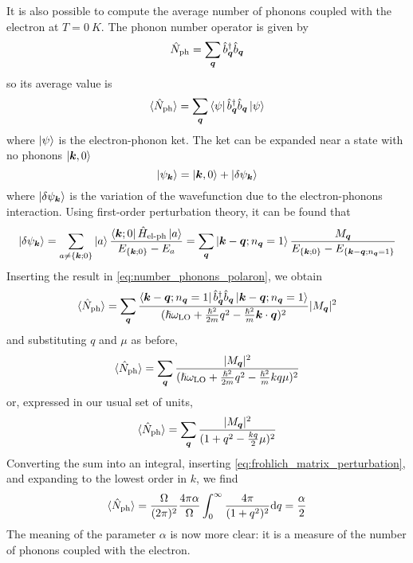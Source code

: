 It is also possible to compute the average number of phonons coupled with the electron at $T = \SI{0}{K}$. The phonon number operator is given by
\begin{equation}
    \hat{N}_\text{ph} = \sum_{\mathbf{\boldsymbol{q}}} \hat{b}^\dagger_{\mathbf{\boldsymbol{q}}} \hat{b}_{\mathbf{\boldsymbol{q}}}
\end{equation}
so its average value is
\begin{equation} \label{eq:number_phonons_polaron}
    \langle \hat{N}_\text{ph} \rangle = \sum_{\mathbf{\boldsymbol{q}}} \bra{\psi} \hat{b}^\dagger_{\mathbf{\boldsymbol{q}}} \hat{b}_{\mathbf{\boldsymbol{q}}} \ket{\psi}
\end{equation}
where $\ket{\psi}$ is the electron-phonon ket. The ket can be expanded near a state with no phonons $\ket{\mathbf{\boldsymbol{k}}, 0}$
\begin{equation}
    \ket{\psi_{\mathbf{\boldsymbol{k}}}} = \ket{\mathbf{\boldsymbol{k}}, 0} + \ket{\delta\psi_{\mathbf{\boldsymbol{k}}}}
\end{equation}
where $\ket{\delta\psi_{\mathbf{\boldsymbol{k}}}}$ is the variation of the wavefunction due to the electron-phonons interaction. Using first-order perturbation theory, it can be found that
\begin{equation} \label{eq:sum_integral}
    \ket{\delta\psi_{\mathbf{\boldsymbol{k}}}} = \sum_{a \neq \{\mathbf{\boldsymbol{k}};0\}} \ket{a} \frac{\bra{\mathbf{\boldsymbol{k}};0} \hat{H}_\text{el-ph} \ket{a}}{E_{\{\mathbf{\boldsymbol{k}};0\}} - E_a}
    = \sum_{\mathbf{\boldsymbol{q}}} \ket{\mathbf{\boldsymbol{k}}-\mathbf{\boldsymbol{q}};n_{\mathbf{\boldsymbol{q}}}=1} \frac{M_{\mathbf{\boldsymbol{q}}}}{E_{\{\mathbf{\boldsymbol{k}};0\}} - E_{\{\mathbf{\boldsymbol{k}}-\mathbf{\boldsymbol{q}};n_{\mathbf{\boldsymbol{q}}}=1\}}}
\end{equation}
Inserting the result in \cref{eq:number_phonons_polaron}, we obtain
\begin{equation}
    \langle \hat{N}_\text{ph} \rangle = \sum_{\mathbf{\boldsymbol{q}}} \frac{\bra{\mathbf{\boldsymbol{k}}-\mathbf{\boldsymbol{q}};n_{\mathbf{\boldsymbol{q}}}=1} \hat{b}^\dagger_{\mathbf{\boldsymbol{q}}} \hat{b}_{\mathbf{\boldsymbol{q}}} \ket{\mathbf{\boldsymbol{k}}-\mathbf{\boldsymbol{q}};n_{\mathbf{\boldsymbol{q}}}=1}}{(\hslash\omega_\text{LO} + \frac{\hslash^2}{2m}q^2 - \frac{\hslash^2}{m}\mathbf{\boldsymbol{k}}\cdot\mathbf{\boldsymbol{q}})^2} |M_{\mathbf{\boldsymbol{q}}}|^2
\end{equation}
and substituting $q$ and $\mu$ as before,
\begin{equation}
    \langle \hat{N}_\text{ph} \rangle = \sum_{\mathbf{\boldsymbol{q}}} \frac{|M_{\mathbf{\boldsymbol{q}}}|^2}{(\hslash\omega_\text{LO} + \frac{\hslash^2}{2m}q^2 - \frac{\hslash^2}{m} kq\mu)^2}
\end{equation}
or, expressed in our usual set of units,
\begin{equation}
    \langle \hat{N}_\text{ph} \rangle = \sum_{\mathbf{\boldsymbol{q}}} \frac{|M_{\mathbf{\boldsymbol{q}}}|^2}{(1 + q^2 - \frac{kq}{2}\mu)^2}
\end{equation}
Converting the sum into an integral, inserting \cref{eq:frohlich_matrix_perturbation}, and expanding to the lowest order in $k$, we find
\begin{equation}
    \langle \oper{N}_\text{ph} \rangle = \frac{\Omega}{(2\pi)^2} \frac{4\pi\alpha}{\Omega} \int_0^\infty \frac{4\pi}{(1+q^2)^2} \differential q = \frac{\alpha}{2}
\end{equation}
The meaning of the parameter $\alpha$ is now more clear: it is a measure of the number of phonons coupled with the electron.

